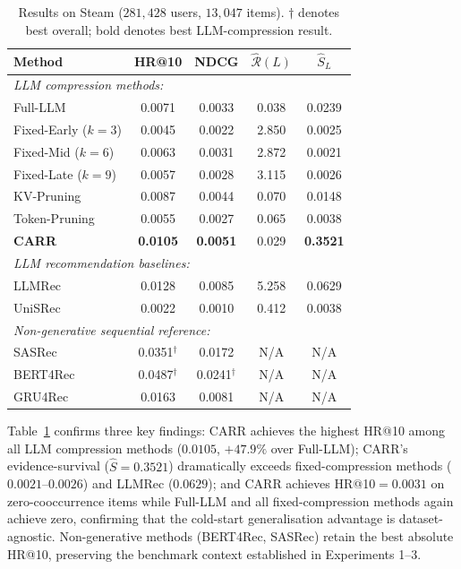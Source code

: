 \documentclass[lettersize,journal]{IEEEtran}
\begin{document}
\begin{table}[!t]
\caption{Results on Steam ($281{,}428$ users, $13{,}047$ items). $\dagger$ denotes best overall; bold denotes best LLM-compression result.\label{tab:steam}}
\centering
\begin{tabular}{l|cc|cc}
\toprule
\textbf{Method} & HR@10 & NDCG & $\widehat{\mathcal{R}}(L)$ & $\widehat{S}_L$ \\
\midrule
\multicolumn{5}{l}{\textit{LLM compression methods:}} \\
Full-LLM & 0.0071 & 0.0033 & 0.038 & 0.0239 \\
Fixed-Early ($k=3$) & 0.0045 & 0.0022 & 2.850 & 0.0025 \\
Fixed-Mid ($k=6$) & 0.0063 & 0.0031 & 2.872 & 0.0021 \\
Fixed-Late ($k=9$) & 0.0057 & 0.0028 & 3.115 & 0.0026 \\
KV-Pruning & 0.0087 & 0.0044 & 0.070 & 0.0148 \\
Token-Pruning & 0.0055 & 0.0027 & 0.065 & 0.0038 \\
\textbf{CARR} & \textbf{0.0105} & \textbf{0.0051} & 0.029 & \textbf{0.3521} \\
\midrule
\multicolumn{5}{l}{\textit{LLM recommendation baselines:}} \\
LLMRec & 0.0128 & 0.0085 & 5.258 & 0.0629 \\
UniSRec & 0.0022 & 0.0010 & 0.412 & 0.0038 \\
\midrule
\multicolumn{5}{l}{\textit{Non-generative sequential reference:}} \\
SASRec & 0.0351\(^\dagger\) & 0.0172 & N/A & N/A \\
BERT4Rec & 0.0487\(^\dagger\) & 0.0241\(^\dagger\) & N/A & N/A \\
GRU4Rec & 0.0163 & 0.0081 & N/A & N/A \\
\bottomrule
\end{tabular}
\end{table}

Table~\ref{tab:steam} confirms three key findings: CARR achieves the highest HR@10 among all LLM compression methods ($0.0105$, $+47.9\%$ over Full-LLM); CARR's evidence-survival ($\widehat{S}=0.3521$) dramatically exceeds fixed-compression methods ($0.0021$--$0.0026$) and LLMRec ($0.0629$); and CARR achieves HR@10$=0.0031$ on zero-cooccurrence items while Full-LLM and all fixed-compression methods again achieve zero, confirming that the cold-start generalisation advantage is dataset-agnostic. Non-generative methods (BERT4Rec, SASRec) retain the best absolute HR@10, preserving the benchmark context established in Experiments 1--3.
\end{document}
